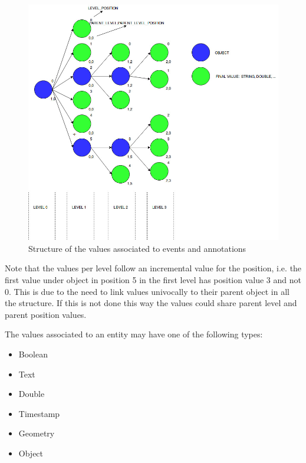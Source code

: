 \begin{figure}[H]
  \begin{center}
	\centering\includegraphics[width=150mm]{../fig/values_structure.jpg}
	\caption{Structure of the values associated to events and annotations}
	\label{fg:values_structure}
  \end{center}
\end{figure}

Note that the values per level follow an incremental value for the position, i.e. the first value under object in position 5 in the first level has position value 3 and not 0. This is due to the need to link values univocally to their parent object in all the structure. If this is not done this way the values could share parent level and parent position values.

The values associated to an entity may have one of the following types:

\begin{itemize}

\item Boolean
\item Text
\item Double
\item Timestamp
\item Geometry
\item Object

\end{itemize}

